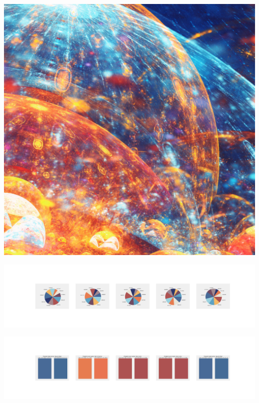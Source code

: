 \documentclass[11pt]{article}
\begin{document}
\begin{landscape}
    \begin{center}
    \includegraphics[width=\textwidth]{./nbimg/file (174).jpg}
    \end{center}

    \begin{center}
    \includegraphics[width=250mm]{./nbimg/pie-83.jpg}
    \end{center}

    \begin{center}
    \includegraphics[width=250mm]{./nbimg/peak-83.jpg}
    \end{center}
    


\end{landscape}
\end{document}
